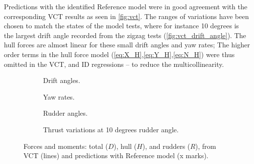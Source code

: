 Predictions with the identified Reference model were in good agreement with the corresponding VCT results as seen in \autoref{fig:vct}. The ranges of variations have been chosen to match the states of the model tests, where for instance 10 degrees is the largest drift angle recorded from the zigzag tests (\autoref{fig:vct_drift_angle}). The hull forces are almost linear for these small drift angles and yaw rates; The higher order terms in the hull force model (\autoref{eq:X_H},\autoref{eq:Y_H},\autoref{eq:N_H}) were thus omitted in the VCT, and ID regressions -- to reduce the multicollinearity.
\begin{figure}
     \centering
     \begin{subfigure}[b]{0.49\textwidth}
         \centering
         
         \caption{Drift angles.}
         \label{fig:vct_drift_angle}
     \end{subfigure}
     \hfill
     \begin{subfigure}[b]{0.49\textwidth}
         \centering
         
         \caption{Yaw rates.}
         \label{fig:vct_circle}
     \end{subfigure}
     \begin{subfigure}[b]{0.49\textwidth}
         \centering
         
         \caption{Rudder angles.}
         \label{fig:vct_rudder_angle}
     \end{subfigure}
     \hfill
     \begin{subfigure}[b]{0.49\textwidth}
         \centering
         
         \caption{Thrust variations at 10 degrees rudder angle.}
         \label{fig:vct_thrust_variation}
     \end{subfigure}
     \caption{Forces and moments: total ($D$), hull ($H$), and rudders ($R$), from VCT (lines) and predictions with Reference model (x marks).}
     \label{fig:vct}
\end{figure}
\begin{table}[h!]
    \centering
    \caption{}
    \label{tab:parameters}
\end{table}